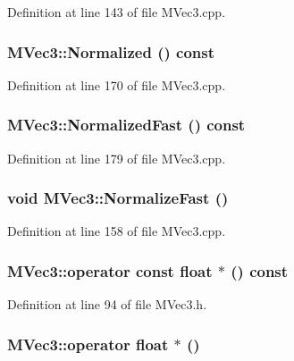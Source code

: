 Definition at line 143 of file MVec3.cpp.\hypertarget{class_m_vec3_139cf1db336ecf0ca02157f6f3605647}{
\subsubsection[{Normalized}]{ MVec3::Normalized () const}}
\label{class_m_vec3_139cf1db336ecf0ca02157f6f3605647}




Definition at line 170 of file MVec3.cpp.\hypertarget{class_m_vec3_4b2ec5935a0621b83cd7fab8187acfb2}{
\subsubsection[{NormalizedFast}]{ MVec3::NormalizedFast () const}}
\label{class_m_vec3_4b2ec5935a0621b83cd7fab8187acfb2}




Definition at line 179 of file MVec3.cpp.\hypertarget{class_m_vec3_d91e67a5315d1817256acae9fc00a849}{
\subsubsection[{NormalizeFast}]{\setlength{\rightskip}{0pt plus 5cm}void MVec3::NormalizeFast ()}}
\label{class_m_vec3_d91e67a5315d1817256acae9fc00a849}




Definition at line 158 of file MVec3.cpp.\hypertarget{class_m_vec3_d8f0366391c63237816895f9892c9f29}{
\subsubsection[{operator const float $\ast$}]{\setlength{\rightskip}{0pt plus 5cm}MVec3::operator const float $\ast$ () const}}
\label{class_m_vec3_d8f0366391c63237816895f9892c9f29}




Definition at line 94 of file MVec3.h.\hypertarget{class_m_vec3_51778c9e74564580936411dbef21c011}{
\subsubsection[{operator float $\ast$}]{\setlength{\rightskip}{0pt plus 5cm}MVec3::operator float $\ast$ ()}}
\label{class_m_vec3_51778c9e74564580936411dbef21c011}




